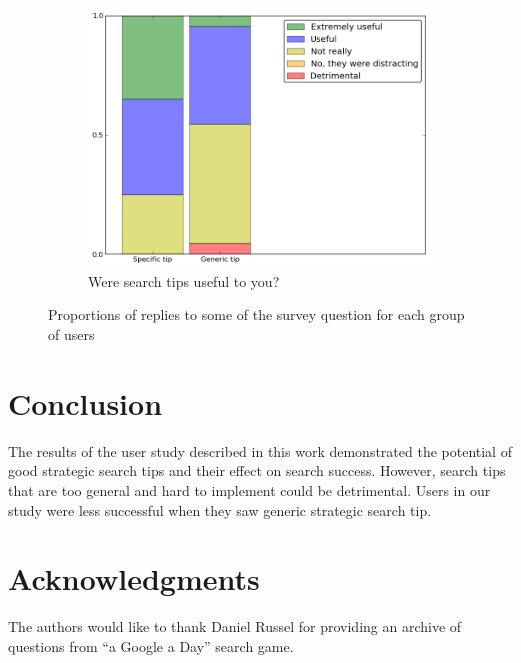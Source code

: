 \documentclass{sig-alternate}
\begin{document}
\begin{figure}[ht]
\begin{subfigure}[t]{0.3\textwidth}
	\includegraphics[scale=0.26]{img/useful}
	\caption{Were search tips useful to you?}
    \label{figure:survey:useful}
\end{subfigure}
\caption{Proportions of replies to some of the survey question for each group of users}
\label{figure:survey}
\end{figure}

\section{Conclusion}
The results of the user study described in this work demonstrated the potential of good strategic search tips and their effect on search success. However, search tips that are too general and hard to implement could be detrimental. Users in our study were less successful when they saw generic strategic search tip. 



\section{Acknowledgments}
The authors would like to thank Daniel Russel for providing an archive of questions from ``a Google a Day'' search game.

%

%
%
\end{document}
